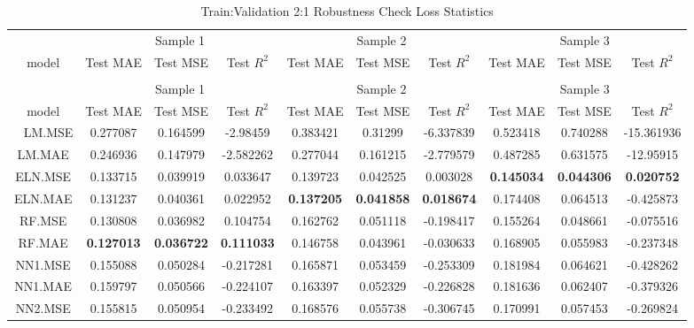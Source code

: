 \begingroup\fontsize{6}{8}\selectfont

\begin{longtable}[t]{cccccccccc}
\caption{\label{tab:}Train:Validation 2:1 Robustness Check Loss Statistics}\\
\toprule
\multicolumn{1}{c}{ } & \multicolumn{3}{c}{Sample 1} & \multicolumn{3}{c}{Sample 2} & \multicolumn{3}{c}{Sample 3} \\
\cmidrule(l{3pt}r{3pt}){2-4} \cmidrule(l{3pt}r{3pt}){5-7} \cmidrule(l{3pt}r{3pt}){8-10}
model & Test MAE & Test MSE & Test $R^2$ & Test MAE & Test MSE & Test $R^2$ & Test MAE & Test MSE & Test $R^2$\\
\midrule
\endfirsthead
\caption[]{Train:Validation 2:1 Robustness Check Loss Statistics }\\
\toprule
\multicolumn{1}{c}{ } & \multicolumn{3}{c}{Sample 1} & \multicolumn{3}{c}{Sample 2} & \multicolumn{3}{c}{Sample 3} \\
\cmidrule(l{3pt}r{3pt}){2-4} \cmidrule(l{3pt}r{3pt}){5-7} \cmidrule(l{3pt}r{3pt}){8-10}
model & Test MAE & Test MSE & Test $R^2$ & Test MAE & Test MSE & Test $R^2$ & Test MAE & Test MSE & Test $R^2$\\
\midrule
\endhead
\
\endfoot
\bottomrule
\endlastfoot
LM.MSE & 0.277087 & 0.164599 & -2.98459 & 0.383421 & 0.31299 & -6.337839 & 0.523418 & 0.740288 & -15.361936\\
LM.MAE & 0.246936 & 0.147979 & -2.582262 & 0.277044 & 0.161215 & -2.779579 & 0.487285 & 0.631575 & -12.95915\\
ELN.MSE & 0.133715 & 0.039919 & 0.033647 & 0.139723 & 0.042525 & 0.003028 & \textbf{0.145034} & \textbf{0.044306} & \textbf{0.020752}\\
ELN.MAE & 0.131237 & 0.040361 & 0.022952 & \textbf{0.137205} & \textbf{0.041858} & \textbf{0.018674} & 0.174408 & 0.064513 & -0.425873\\
RF.MSE & 0.130808 & 0.036982 & 0.104754 & 0.162762 & 0.051118 & -0.198417 & 0.155264 & 0.048661 & -0.075516\\
\addlinespace
RF.MAE & \textbf{0.127013} & \textbf{0.036722} & \textbf{0.111033} & 0.146758 & 0.043961 & -0.030633 & 0.168905 & 0.055983 & -0.237348\\
NN1.MSE & 0.155088 & 0.050284 & -0.217281 & 0.165871 & 0.053459 & -0.253309 & 0.181984 & 0.064621 & -0.428262\\
NN1.MAE & 0.159797 & 0.050566 & -0.224107 & 0.163397 & 0.052329 & -0.226828 & 0.181636 & 0.062407 & -0.379326\\
NN2.MSE & 0.155815 & 0.050954 & -0.233492 & 0.168576 & 0.055738 & -0.306745 & 0.170991 & 0.057453 & -0.269824\\

\end{longtable}
